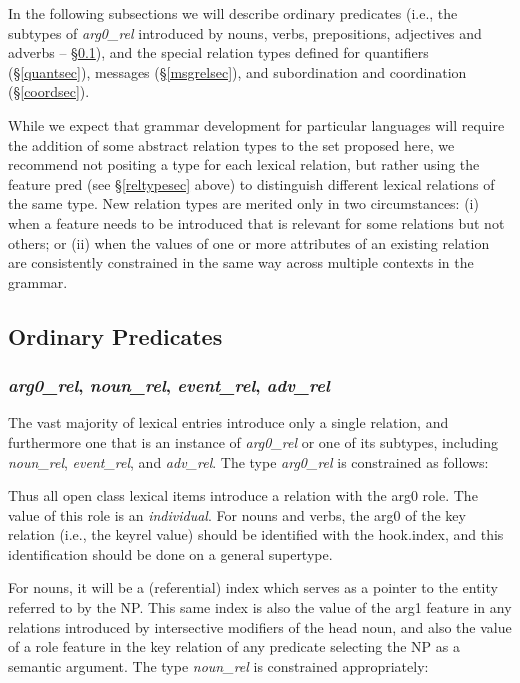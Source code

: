 \documentclass[12pt]{article}
\newcommand{\es}{\enumsentence}
\begin{document}
In the following subsections we will describe
ordinary predicates (i.e., the subtypes of {\it arg0\_rel} introduced by
nouns, verbs, prepositions, adjectives and
adverbs -- \S\ref{ordpred}), and the special relation types defined
for quantifiers (\S\ref{quantsec}), messages (\S\ref{msgrelsec}), and
subordination and coordination (\S\ref{coordsec}).

While we expect that grammar development for particular languages will
require the addition of some abstract relation types to the set
proposed here, we recommend not positing a type for each lexical
relation, but rather using the feature {\sc pred} (see
\S\ref{reltypesec} above) to distinguish different lexical relations
of the same type.  New relation types are merited only in two circumstances:
(i) when a feature needs to be introduced that is relevant for some relations
but not others; or (ii) when the values of one or more attributes of an 
existing relation are consistently constrained in the same way across multiple
contexts in the grammar.

\subsection{Ordinary Predicates}
\label{ordpred}

\subsubsection{{\it arg0\_rel}, {\it noun\_rel}, {\it event\_rel}, {\it adv\_rel}}
\label{arg0sec}

The vast majority of lexical entries introduce only a single relation,
and furthermore one that is an instance of {\it arg0\_rel} or one of its
subtypes, including {\it noun\_rel}, {\it event\_rel}, and {\it adv\_rel}.  
The type {\it arg0\_rel} is constrained as follows:

\es{
\begin{avm}
{\it arg0\_rel}: \[ arg0 & individual \]
\end{avm}
}

Thus all open class lexical items introduce a relation with the {\sc
arg0} role.  The value of this role is an {\it individual}.  For nouns
and verbs, the {\sc arg0} of the key relation (i.e., the {\sc {-}{-}keyrel} value) should be identified with
the {\sc hook.index}, and this identification should be done on a general
supertype.

For nouns, it will be a (referential) index which serves as a pointer
to the entity referred to by the NP.  This
same index is also the value of the {\sc arg1} feature in any relations
introduced by intersective modifiers of the head noun, and also the value of 
a role feature in the key 
relation of any predicate selecting the NP as a semantic argument.  The type
{\it noun\_rel} is constrained appropriately:
\end{document}
